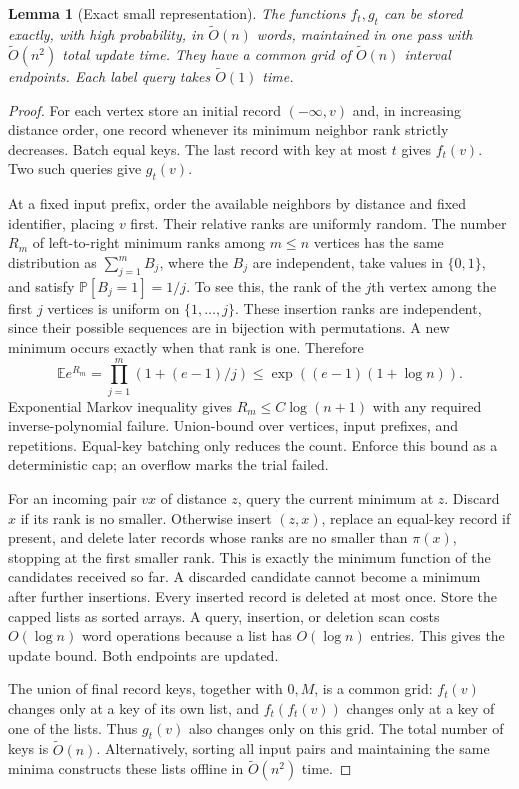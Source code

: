 \documentclass[11pt]{article}
\newtheorem{lemma}[theorem]{Lemma}
\theoremstyle{definition}
\newcommand{\E}{\mathbb E}
\newcommand{\Prb}{\mathbb P}
\newcommand{\wt}{\widetilde}
\begin{document}
\begin{lemma}[Exact small representation]\label{lem:records}
The functions $f_t,g_t$ can be stored exactly, with high probability, in
$\wt O(n)$ words, maintained in one pass with $\wt O(n^2)$ total update
time. They have a common grid of $\wt O(n)$ interval endpoints.
Each label query takes $\wt O(1)$ time.
\end{lemma}
\begin{proof}
For each vertex store an initial record $(-\infty,v)$ and, in increasing
distance order, one record whenever its minimum neighbor rank strictly
decreases. Batch equal keys. The last record with key at most $t$ gives
$f_t(v)$. Two such queries give $g_t(v)$.

At a fixed input prefix, order the available neighbors by distance and
fixed identifier, placing $v$ first. Their relative ranks are uniformly
random. The number $R_m$ of left-to-right minimum ranks among $m\le n$
vertices has the same distribution as $\sum_{j=1}^m B_j$, where the
$B_j$ are independent, take values in $\{0,1\}$, and satisfy
$\Prb[B_j=1]=1/j$. To see this, the rank of the $j$th vertex among the
first $j$ vertices is uniform on $\{1,\ldots,j\}$. These insertion
ranks are independent, since their possible sequences are in bijection
with permutations. A new minimum occurs exactly when that rank is one. Therefore
\[
 \E e^{R_m}=\prod_{j=1}^m(1+(e-1)/j)
 \le \exp((e-1)(1+\log n)).
\]
Exponential Markov inequality gives $R_m\le C\log(n+1)$ with any required
inverse-polynomial failure. Union-bound over vertices, input prefixes,
and repetitions. Equal-key batching only reduces the count.
Enforce this bound as a deterministic cap; an overflow marks the trial
failed.

For an incoming pair $vx$ of distance $z$, query the current minimum at
$z$. Discard $x$ if its rank is no smaller. Otherwise insert $(z,x)$,
replace an equal-key record if present, and delete later records whose
ranks are no smaller than $\pi(x)$, stopping at the first smaller rank.
This is exactly the minimum function of the candidates received so far.
A discarded candidate cannot become a minimum after further insertions.
Every inserted record is deleted at most once. Store the capped lists as
sorted arrays. A query, insertion, or deletion scan costs $O(\log n)$
word operations because a list has $O(\log n)$ entries. This gives the
update bound. Both endpoints are updated.

The union of final record keys, together with $0,M$, is a common grid:
$f_t(v)$ changes only at a key of its own list, and $f_t(f_t(v))$ changes
only at a key of one of the lists. Thus $g_t(v)$ also changes only on this
grid. The total number of keys is $\wt O(n)$. Alternatively, sorting all
input pairs and maintaining the same minima constructs these lists
offline in $\wt O(n^2)$ time.
\end{proof}
\end{document}
